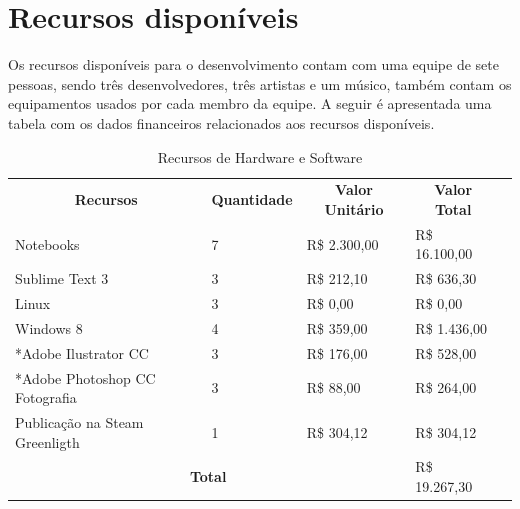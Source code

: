 \documentclass[a4paper,11pt]{article}
\begin{document}
\section{Recursos disponíveis}

Os recursos disponíveis para o desenvolvimento contam com uma equipe de sete pessoas, sendo três desenvolvedores, três artistas e um músico, também contam os equipamentos usados por cada membro da equipe. A seguir é apresentada uma tabela com os dados financeiros relacionados aos recursos disponíveis.

\begin{table}[h]
\begin{tabular}{|l|l|l|l|l}
\cline{1-4}
\multicolumn{1}{|c|}{\textbf{Recursos}} & \multicolumn{1}{c|}{\textbf{Quantidade}} & \multicolumn{1}{c|}{\textbf{Valor Unitário}} & \multicolumn{1}{c|}{\textbf{Valor Total}} &  \\ \cline{1-4}
Notebooks                               & 7                                        & R\$ 2.300,00                                  & R\$ 16.100,00                             &  \\ \cline{1-4}
Sublime Text 3                          & 3                                        & R\$ 212,10                                   & R\$ 636,30                                &  \\ \cline{1-4}
Linux                                   & 3                                        & R\$ 0,00                                     & R\$ 0,00                                  &  \\ \cline{1-4}
Windows 8                               & 4                                        & R\$ 359,00                                   & R\$ 1.436,00                              &  \\ \cline{1-4}
*Adobe Ilustrator CC                    & 3                                        & R\$ 176,00                                   & R\$ 528,00                                &  \\ \cline{1-4}
*Adobe Photoshop CC Fotografia          & 3                                        & R\$ 88,00                                    & R\$ 264,00                                &  \\ \cline{1-4}
Publicação na Steam Greenligth          & 1                                        & R\$ 304,12                                   & R\$ 304,12                                &  \\ \cline{1-4}
\multicolumn{3}{|c|}{\textbf{Total}}                                                                                              & R\$ 19.267,30                             &  \\ \cline{1-4}
\end{tabular}
\caption {Recursos de Hardware e Software}
\end{table}
\end{document}
